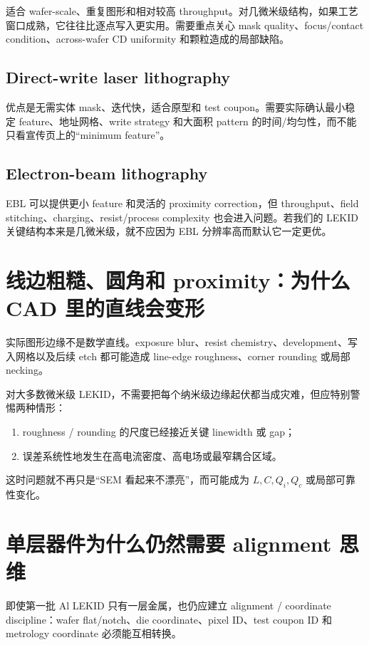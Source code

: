 适合 wafer-scale、重复图形和相对较高 throughput。对几微米级结构，如果工艺窗口成熟，它往往比逐点写入更实用。需要重点关心 mask quality、focus/contact condition、across-wafer CD uniformity 和颗粒造成的局部缺陷。

\subsection{Direct-write laser lithography}

优点是无需实体 mask、迭代快，适合原型和 test coupon。需要实际确认最小稳定 feature、地址网格、write strategy 和大面积 pattern 的时间/均匀性，而不能只看宣传页上的“minimum feature”。

\subsection{Electron-beam lithography}

EBL 可以提供更小 feature 和灵活的 proximity correction，但 throughput、field stitching、charging、resist/process complexity 也会进入问题。若我们的 LEKID 关键结构本来是几微米级，就不应因为 EBL 分辨率高而默认它一定更优。

\section{线边粗糙、圆角和 proximity：为什么 CAD 里的直线会变形}

实际图形边缘不是数学直线。exposure blur、resist chemistry、development、写入网格以及后续 etch 都可能造成 line-edge roughness、corner rounding 或局部 necking。

对大多数微米级 LEKID，不需要把每个纳米级边缘起伏都当成灾难，但应特别警惕两种情形：

\begin{enumerate}
  \item roughness / rounding 的尺度已经接近关键 linewidth 或 gap；
  \item 误差系统性地发生在高电流密度、高电场或最窄耦合区域。
\end{enumerate}

这时问题就不再只是“SEM 看起来不漂亮”，而可能成为 $L,C,Q_i,Q_c$ 或局部可靠性变化。

\section{单层器件为什么仍然需要 alignment 思维}

即使第一批 Al LEKID 只有一层金属，也仍应建立 alignment / coordinate discipline：wafer flat/notch、die coordinate、pixel ID、test coupon ID 和 metrology coordinate 必须能互相转换。

